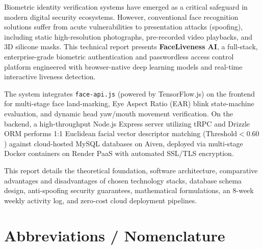 \documentclass[12pt,a4paper,oneside]{article}
\begin{document}
\begin{doublespace}
Biometric identity verification systems have emerged as a critical safeguard in modern digital security ecosystems. However, conventional face recognition solutions suffer from acute vulnerabilities to presentation attacks (spoofing), including static high-resolution photographs, pre-recorded video playbacks, and 3D silicone masks. This technical report presents \textbf{FaceLiveness AI}, a full-stack, enterprise-grade biometric authentication and passwordless access control platform engineered with browser-native deep learning models and real-time interactive liveness detection.

The system integrates \texttt{face-api.js} (powered by TensorFlow.js) on the frontend for multi-stage face land-marking, Eye Aspect Ratio (EAR) blink state-machine evaluation, and dynamic head yaw/mouth movement verification. On the backend, a high-throughput Node.js Express server utilizing tRPC and Drizzle ORM performs 1:1 Euclidean facial vector descriptor matching ($\text{Threshold} < 0.60$) against cloud-hosted MySQL databases on Aiven, deployed via multi-stage Docker containers on Render PaaS with automated SSL/TLS encryption.

This report details the theoretical foundation, software architecture, comparative advantages and disadvantages of chosen technology stacks, database schema design, anti-spoofing security guarantees, mathematical formulations, an 8-week weekly activity log, and zero-cost cloud deployment pipelines.
\end{doublespace}

\newpage

\tableofcontents
\newpage

\listoffigures
{}

\listoftables
{}

\newpage

\section*{Abbreviations / Nomenclature}
\end{document}
